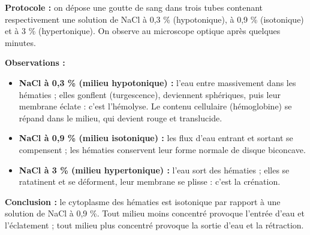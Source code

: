 \documentclass[11pt]{article}
\newcommand{\cle}[1]{{\popxbold\color{popdark}#1}}
\begin{document}
\begin{experience}
\textbf{Protocole :} on dépose une goutte de sang dans trois tubes contenant respectivement une solution de NaCl à 0,3 \% (hypotonique), à 0,9 \% (isotonique) et à 3 \% (hypertonique). On observe au microscope optique après quelques minutes.

\textbf{Observations :}
\begin{itemize}
\item \textbf{NaCl à 0,3 \% (milieu hypotonique) :} l'eau entre massivement dans les hématies ; elles gonflent (\cle{turgescence}), deviennent sphériques, puis leur membrane éclate : c'est l'\cle{hémolyse}. Le contenu cellulaire (hémoglobine) se répand dans le milieu, qui devient rouge et translucide.
\item \textbf{NaCl à 0,9 \% (milieu isotonique) :} les flux d'eau entrant et sortant se compensent ; les hématies conservent leur forme normale de disque biconcave.
\item \textbf{NaCl à 3 \% (milieu hypertonique) :} l'eau sort des hématies ; elles se ratatinent et se déforment, leur membrane se plisse : c'est la \cle{crénation}.
\end{itemize}

\textbf{Conclusion :} le cytoplasme des hématies est isotonique par rapport à une solution de NaCl à 0,9 \%. Tout milieu moins concentré provoque l'entrée d'eau et l'éclatement ; tout milieu plus concentré provoque la sortie d'eau et la rétraction.
\end{experience}
\end{document}
